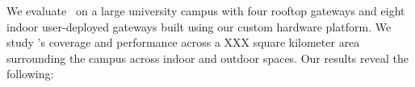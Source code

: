 



We evaluate \name\ on a large university campus with four rooftop gateways and eight indoor user-deployed gateways built using our custom hardware platform. We study \name's coverage and performance across a XXX square kilometer area surrounding the campus across indoor and outdoor spaces. Our results reveal the following:

